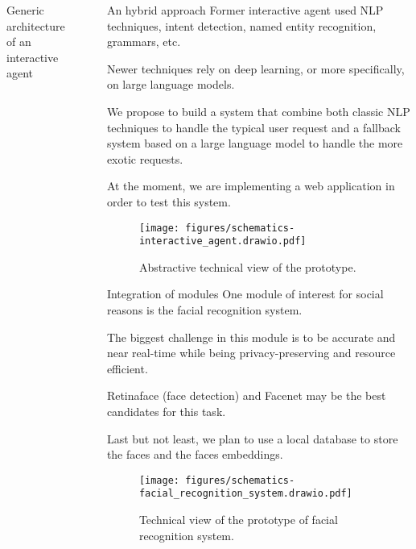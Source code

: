\documentclass[final]{beamer}
\newlength{\sepwidth}
\newlength{\colwidth}
\newcommand{\separatorcolumn}{\begin{column}{\sepwidth}\end{column}}
\begin{document}
\begin{frame}[t]
\begin{columns}[t]
\begin{column}{\colwidth}
\begin{alertblock}{Generic architecture of an interactive agent}
      \end{alertblock}

    \end{column}

    \separatorcolumn

    \begin{column}{\colwidth}

      \begin{block}{An hybrid approach}
        Former interactive agent used NLP techniques, intent detection, named entity recognition, grammars, etc.

        Newer techniques rely on deep learning, or more specifically, on large language models.

        We propose to build a system that combine both classic NLP techniques to handle the typical user request and a fallback system based on a large language model to handle the more exotic requests.

        At the moment, we are implementing a web application in order to test this system.
        \begin{figure}[ht]
          \centering
          \texttt{[image: figures/schematics-interactive\_agent.drawio.pdf]}
          \caption{Abstractive technical view of the prototype.\label{fig:abstractive_view_interface}}
        \end{figure}
      \end{block}

      \begin{block}{Integration of modules}
        One module of interest for social reasons is the facial recognition system.

        The biggest challenge in this module is to be accurate and near real-time while being privacy-preserving and resource efficient.

        Retinaface\cite{dengRetinaFaceSinglestageDense2019} (face detection) and Facenet\cite{jekelClassifyingOnlineDating2018}  may be the best candidates for this task.

        Last but not least, we plan to use a local database to store the faces and the faces embeddings.

        \begin{figure}[!ht]
          \centering
          \texttt{[image: figures/schematics-facial\_recognition\_system.drawio.pdf]}
          \caption{Technical view of the prototype of facial recognition system.\label{fig:facial_recognition_technical_view}}
        \end{figure}
      \end{block}


\end{column}
\end{columns}
\end{frame}
\end{document}
